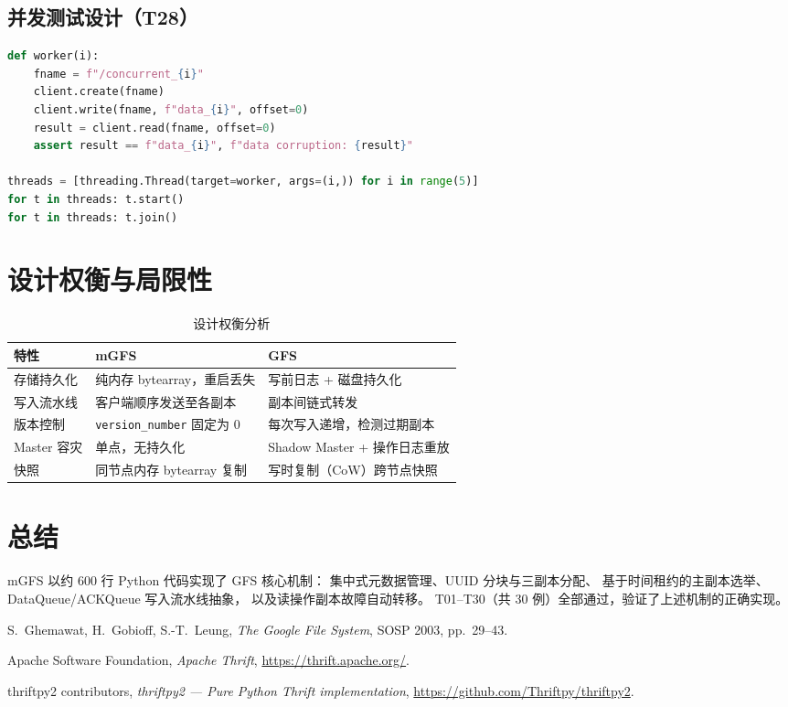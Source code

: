 \documentclass[10pt,a4paper]{article}
\begin{document}
\subsection{并发测试设计（T28）}

\begin{lstlisting}[language=Python, caption={T28 并发数据隔离测试（test\_cluster.py）}]
def worker(i):
    fname = f"/concurrent_{i}"
    client.create(fname)
    client.write(fname, f"data_{i}", offset=0)
    result = client.read(fname, offset=0)
    assert result == f"data_{i}", f"data corruption: {result}"

threads = [threading.Thread(target=worker, args=(i,)) for i in range(5)]
for t in threads: t.start()
for t in threads: t.join()
\end{lstlisting}

\section{设计权衡与局限性}

\begin{table}[H]
\centering
\caption{设计权衡分析}
\begin{tabularx}{\textwidth}{lXX}
\toprule
\textbf{特性} & \textbf{mGFS} & \textbf{GFS} \\
\midrule
存储持久化  & 纯内存 bytearray，重启丢失      & 写前日志 + 磁盘持久化 \\
写入流水线  & 客户端顺序发送至各副本          & 副本间链式转发 \\
版本控制    & \texttt{version\_number} 固定为 0 & 每次写入递增，检测过期副本 \\
Master 容灾 & 单点，无持久化                  & Shadow Master + 操作日志重放 \\
快照        & 同节点内存 bytearray 复制       & 写时复制（CoW）跨节点快照 \\
\bottomrule
\end{tabularx}
\end{table}

\section{总结}

mGFS 以约 600 行 Python 代码实现了 GFS 核心机制：
集中式元数据管理、UUID 分块与三副本分配、
基于时间租约的主副本选举、DataQueue/ACKQueue 写入流水线抽象，
以及读操作副本故障自动转移。
T01--T30（共 30 例）全部通过，验证了上述机制的正确实现。

\begin{thebibliography}{9}
  S.~Ghemawat, H.~Gobioff, S.-T.~Leung,
  \textit{The Google File System},
  SOSP 2003, pp.~29--43.

  Apache Software Foundation,
  \textit{Apache Thrift},
  \url{https://thrift.apache.org/}.

  thriftpy2 contributors,
  \textit{thriftpy2 — Pure Python Thrift implementation},
  \url{https://github.com/Thriftpy/thriftpy2}.
\end{thebibliography}
\end{document}

